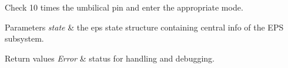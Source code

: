 Check 10 times the umbilical pin and enter the appropriate mode. 


\begin{DoxyParams}{Parameters}
{\em state} & the eps state structure containing central info of the E\-P\-S subsystem. \\
\hline
\end{DoxyParams}

\begin{DoxyRetVals}{Return values}
{\em Error} & status for handling and debugging. \\
\hline
\end{DoxyRetVals}
